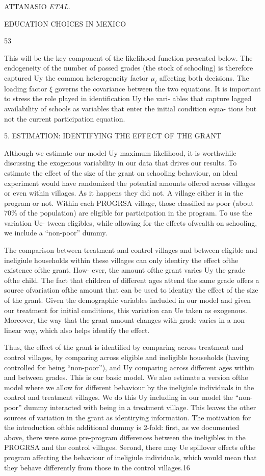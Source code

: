 ATTANASIO {\it ETAL}.

EDUCATION CHOICES IN MEXICO

53

This will be the key component of the likelihood function presented below. The endogeneity of the number of passed grades (the stock of schooling) is therefore captured Uy the common heterogeneity factor $\mu_{i}$ affecting both decisions. The loading factor $\xi$ governs the covariance between the two equations. It is important to stress the role played in identification Uy the vari- ables that capture lagged availability of schools as variables that enter the initial condition equa- tions but not the current participation equation.

5. ESTIMATION: IDENTIFYING THE EFFECT OF THE GRANT

Although we estimate our model Uy maximum likelihood, it is worthwhile discussing the exogenous variability in our data that drives our results. To estimate the effect of the size of the grant on schooling behaviour, an ideal experiment would have randomized the potential amounts offered across villages or even within villages. As it happens they did not. A village either is in the program or not. Within each PROGRSA village, those classified as poor (about 70\% of the population) are eligible for participation in the program. To use the variation Ue- tween eligibles, while allowing for the effects ofwealth on schooling, we include a ``non-poor'' dummy.

The comparison between treatment and control villages and between eligible and ineligiule households within these villages can only identiry the effect ofthe existence ofthe grant. How- ever, the amount ofthe grant varies Uy the grade ofthe child. The fact that children of different ages attend the same grade offers a source ofvariation ofthe amount that can be used to identiry the effect of the size of the grant. Given the demographic variables included in our model and given our treatment for initial conditions, this variation can Ue taken as exogenous. Moreover, the way that the grant amount changes with grade varies in a non-linear way, which also helps identify the effect.

Thus, the effect of the grant is identified by comparing across treatment and control villages, by comparing across eligible and ineligible households (having controlled for being ``non-poor''), and Uy comparing across different ages within and between grades. This is our basic model. We also estimate a version ofthe model where we allow for different behaviour by the ineligiule individuals in the control and treatment villages. We do this Uy including in our model the ``non-poor'' dummy interacted with being in a treatment village. This leaves the other sources of variation in the grant as identirying information. The motivation for the introduction ofthis additional dummy is 2-fold: first, as we documented above, there were some pre-program differences between the ineligibles in the PROGRSA and the control villages. Second, there may Ue spillover effects ofthe program affecting the behaviour of ineligiule individuals, which would mean that they behave differently from those in the control villages.16

